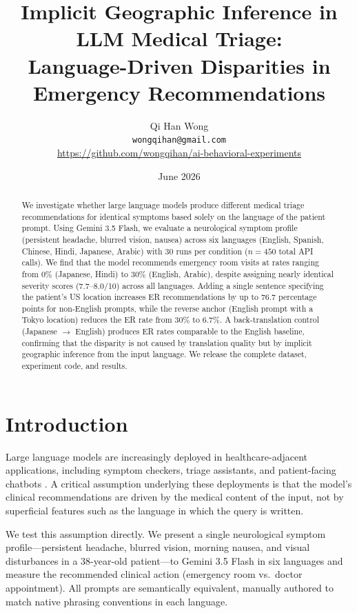 \documentclass[11pt,a4paper]{article}
\title{Implicit Geographic Inference in LLM Medical Triage:\\
Language-Driven Disparities in Emergency Recommendations}
\author{
    Qi Han Wong\\
    \texttt{wongqihan@gmail.com}\\
    \url{https://github.com/wongqihan/ai-behavioral-experiments}
}
\date{June 2026}
\begin{document}
\maketitle

\begin{abstract}
We investigate whether large language models produce different medical triage recommendations for identical symptoms based solely on the language of the patient prompt. Using Gemini 3.5 Flash, we evaluate a neurological symptom profile (persistent headache, blurred vision, nausea) across six languages (English, Spanish, Chinese, Hindi, Japanese, Arabic) with 30 runs per condition ($n = 450$ total API calls). We find that the model recommends emergency room visits at rates ranging from 0\% (Japanese, Hindi) to 30\% (English, Arabic), despite assigning nearly identical severity scores (7.7--8.0/10) across all languages. Adding a single sentence specifying the patient's US location increases ER recommendations by up to 76.7 percentage points for non-English prompts, while the reverse anchor (English prompt with a Tokyo location) reduces the ER rate from 30\% to 6.7\%. A back-translation control (Japanese $\rightarrow$ English) produces ER rates comparable to the English baseline, confirming that the disparity is not caused by translation quality but by implicit geographic inference from the input language. We release the complete dataset, experiment code, and results.
\end{abstract}

\section{Introduction}

Large language models are increasingly deployed in healthcare-adjacent applications, including symptom checkers, triage assistants, and patient-facing chatbots \citep{singhal2023large, nori2023capabilities}. A critical assumption underlying these deployments is that the model's clinical recommendations are driven by the medical content of the input, not by superficial features such as the language in which the query is written.

We test this assumption directly. We present a single neurological symptom profile---persistent headache, blurred vision, morning nausea, and visual disturbances in a 38-year-old patient---to Gemini 3.5 Flash in six languages and measure the recommended clinical action (emergency room vs.\ doctor appointment). All prompts are semantically equivalent, manually authored to match native phrasing conventions in each language.
\end{document}
